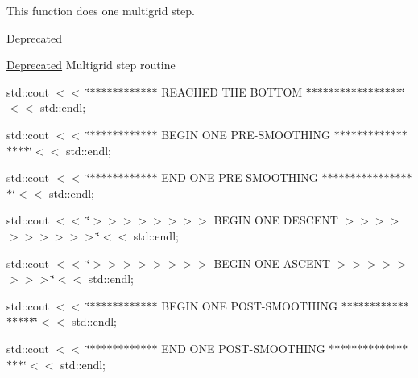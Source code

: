This function does one multigrid step. 

\begin{DoxyRefDesc}{Deprecated}
\item[\mbox{\hyperlink{deprecated__deprecated000013}{Deprecated}}]Multigrid step routine \end{DoxyRefDesc}
std\+::cout $<$$<$ \char`\"{}$\ast$$\ast$$\ast$$\ast$$\ast$$\ast$$\ast$$\ast$$\ast$$\ast$$\ast$$\ast$ R\+E\+A\+C\+H\+E\+D T\+H\+E B\+O\+T\+T\+O\+M $\ast$$\ast$$\ast$$\ast$$\ast$$\ast$$\ast$$\ast$$\ast$$\ast$$\ast$$\ast$$\ast$$\ast$$\ast$$\ast$$\ast$\char`\"{}$<$$<$ std\+::endl;

std\+::cout $<$$<$ \char`\"{}$\ast$$\ast$$\ast$$\ast$$\ast$$\ast$$\ast$$\ast$$\ast$$\ast$$\ast$$\ast$ B\+E\+G\+I\+N O\+N\+E P\+R\+E-\/\+S\+M\+O\+O\+T\+H\+I\+N\+G $\ast$$\ast$$\ast$$\ast$$\ast$$\ast$$\ast$$\ast$$\ast$$\ast$$\ast$$\ast$$\ast$$\ast$$\ast$$\ast$$\ast$\char`\"{}$<$$<$ std\+::endl;

std\+::cout $<$$<$ \char`\"{}$\ast$$\ast$$\ast$$\ast$$\ast$$\ast$$\ast$$\ast$$\ast$$\ast$$\ast$$\ast$ E\+N\+D O\+N\+E P\+R\+E-\/\+S\+M\+O\+O\+T\+H\+I\+N\+G $\ast$$\ast$$\ast$$\ast$$\ast$$\ast$$\ast$$\ast$$\ast$$\ast$$\ast$$\ast$$\ast$$\ast$$\ast$$\ast$$\ast$\char`\"{}$<$$<$ std\+::endl;

std\+::cout $<$$<$ \char`\"{}$>$$>$$>$$>$$>$$>$$>$$>$ B\+E\+G\+I\+N O\+N\+E D\+E\+S\+C\+E\+N\+T $>$$>$$>$$>$$>$$>$$>$$>$$>$$>$\char`\"{}$<$$<$ std\+::endl;

std\+::cout $<$$<$ \char`\"{}$>$$>$$>$$>$$>$$>$$>$$>$ B\+E\+G\+I\+N O\+N\+E A\+S\+C\+E\+N\+T $>$$>$$>$$>$$>$$>$$>$$>$\char`\"{}$<$$<$ std\+::endl;

std\+::cout $<$$<$ \char`\"{}$\ast$$\ast$$\ast$$\ast$$\ast$$\ast$$\ast$$\ast$$\ast$$\ast$$\ast$$\ast$ B\+E\+G\+I\+N O\+N\+E P\+O\+S\+T-\/\+S\+M\+O\+O\+T\+H\+I\+N\+G $\ast$$\ast$$\ast$$\ast$$\ast$$\ast$$\ast$$\ast$$\ast$$\ast$$\ast$$\ast$$\ast$$\ast$$\ast$$\ast$$\ast$\char`\"{}$<$$<$ std\+::endl;

std\+::cout $<$$<$ \char`\"{}$\ast$$\ast$$\ast$$\ast$$\ast$$\ast$$\ast$$\ast$$\ast$$\ast$$\ast$$\ast$ E\+N\+D O\+N\+E P\+O\+S\+T-\/\+S\+M\+O\+O\+T\+H\+I\+N\+G $\ast$$\ast$$\ast$$\ast$$\ast$$\ast$$\ast$$\ast$$\ast$$\ast$$\ast$$\ast$$\ast$$\ast$$\ast$$\ast$$\ast$\char`\"{}$<$$<$ std\+::endl; \mbox{\label{classfemus_1_1_linear_implicit_system_abaae648f9914d950798ba7a8a7f58818}} 

